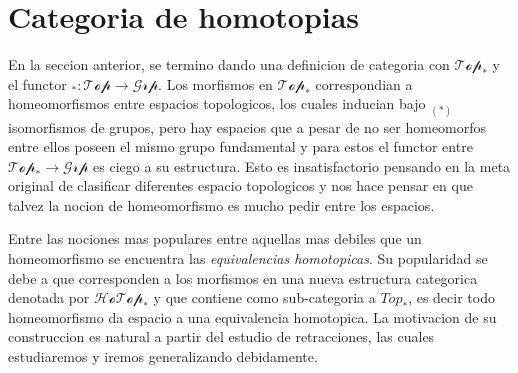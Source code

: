 \section*{Categoria de homotopias}
En la seccion anterior, se termino dando una definicion de categoria con
\(\mathscr{Top}_*\) y el functor \(_{{*}} : \mathscr{Top} \to
\mathscr{Grp}\). Los morfismos en \(\mathscr{Top}_*\) correspondian a
homeomorfismos entre espacios topologicos, los cuales inducian bajo
\(_{(*)}\) isomorfismos de grupos, pero hay espacios que a pesar de no
ser homeomorfos entre ellos poseen el mismo grupo fundamental y para
estos el functor entre \(\mathscr{Top}_* \to \mathscr{Grp}\) es ciego a
su estructura. Esto es insatisfactorio pensando en la meta
original de clasificar diferentes espacio topologicos y nos hace pensar
en que talvez la nocion de homeomorfismo es mucho pedir entre los
espacios.

Entre las nociones mas populares entre aquellas mas debiles que un
homeomorfismo se encuentra las \emph{equivalencias homotopicas}. Su
popularidad se debe a que corresponden a los morfismos en una nueva
estructura categorica denotada por \(\mathscr{HoTop}_*\) y que contiene
como sub-categoria a \(Top_*\), es decir todo homeomorfismo da espacio a
una equivalencia homotopica. La motivacion de su construccion es natural
a partir del estudio de retracciones, las cuales estudiaremos y iremos
generalizando debidamente.

